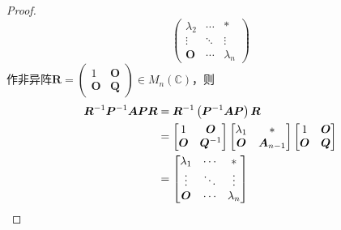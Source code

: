 {\begin{proof}
\[\begin{pmatrix}
                \lambda_2 & \cdots & *           \\
                \vdots    & \ddots & \vdots      \\
                \bm{O}    & \cdots & \lambda_{n}
            \end{pmatrix}
        \]作非异阵$
            \bm{R}=\begin{pmatrix}
                1      & \bm{O} \\
                \bm{O} & \bm{Q}
            \end{pmatrix}\in M_n\left(
            \mathbb{C}
            \right)$，则
        \begin{align*}
            \bm{R}^{-1}\bm{P}^{-1}\bm{APR} & =
            \bm{R}^{-1}\left(
            \bm{P}^{-1}\bm{A}\bm{P}
            \right)\bm{R}                                                               \\
                                           & =\begin{bmatrix}
                                                  1      & \bm{O}      \\
                                                  \bm{O} & \bm{Q}^{-1}
                                              \end{bmatrix}\begin{bmatrix}
                                                               \lambda_1 & *            \\
                                                               \bm{O}    & \bm{A}_{n-1}
                                                           \end{bmatrix}\begin{bmatrix}
                                                                            1      & \bm{O} \\
                                                                            \bm{O} & \bm{Q}
                                                                        \end{bmatrix} \\
                                           & =
            \begin{bmatrix}
                \lambda_1 & \cdots & *         \\
                \vdots    & \ddots & \vdots    \\
                \bm{O}    & \cdots & \lambda_n
            \end{bmatrix}\qedhere
        \end{align*}
    \end{proof}
}

